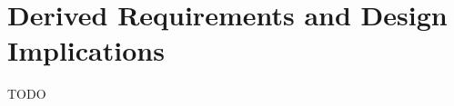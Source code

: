 \section{Derived Requirements and Design Implications} %


\begin{justify}
    TODO
\end{justify}






